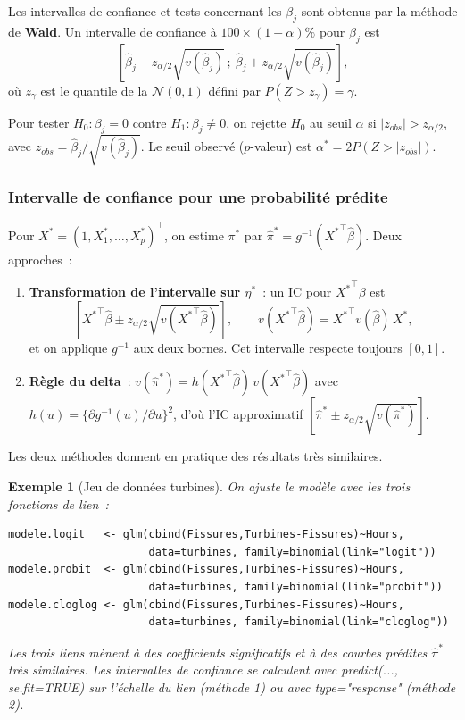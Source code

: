 \documentclass[11pt,letterpaper]{article}
\newtheorem{exemple}{Exemple}[section]
\begin{document}
Les intervalles de confiance et tests concernant les $\beta_j$ sont obtenus par la méthode de \textbf{Wald}. Un intervalle de confiance à $100\times(1-\alpha)\%$ pour $\beta_j$ est
$$\left[\hat\beta_j - z_{\alpha/2}\sqrt{v(\hat\beta_j)}\,;\ \hat\beta_j + z_{\alpha/2}\sqrt{v(\hat\beta_j)}\right],$$
où $z_\gamma$ est le quantile de la $\mathcal{N}(0,1)$ défini par $P(Z > z_\gamma) = \gamma$.

Pour tester $H_0: \beta_j = 0$ contre $H_1: \beta_j\neq 0$, on rejette $H_0$ au seuil $\alpha$ si $|z_{obs}| > z_{\alpha/2}$, avec $z_{obs} = \hat\beta_j/\sqrt{v(\hat\beta_j)}$. Le seuil observé ($p$-valeur) est $\alpha^* = 2P(Z > |z_{obs}|)$.

\subsubsection{Intervalle de confiance pour une probabilité prédite}

Pour $X^* = (1, X_1^*,\ldots,X_p^*)^\top$, on estime $\pi^*$ par $\hat\pi^* = g^{-1}({X^*}^\top\hat\beta)$. Deux approches~:
\begin{enumerate}
\item \textbf{Transformation de l'intervalle sur $\eta^*$}~: un IC pour ${X^*}^\top\beta$ est
$$\left[{X^*}^\top\hat\beta \pm z_{\alpha/2}\sqrt{v({X^*}^\top\hat\beta)}\right], \qquad v({X^*}^\top\hat\beta) = {X^*}^\top v(\hat\beta)\, X^*,$$
et on applique $g^{-1}$ aux deux bornes. Cet intervalle respecte toujours $[0,1]$.
\item \textbf{Règle du delta}~: $v(\hat\pi^*) = h({X^*}^\top\hat\beta)\, v({X^*}^\top\hat\beta)$ avec $h(u) = \{\partial g^{-1}(u)/\partial u\}^2$, d'où l'IC approximatif $\left[\hat\pi^* \pm z_{\alpha/2}\sqrt{v(\hat\pi^*)}\right]$.
\end{enumerate}
Les deux méthodes donnent en pratique des résultats très similaires.

\begin{exemple}[Jeu de données \textsf{turbines}]
On ajuste le modèle avec les trois fonctions de lien~:
\begin{verbatim}
modele.logit   <- glm(cbind(Fissures,Turbines-Fissures)~Hours,
                      data=turbines, family=binomial(link="logit"))
modele.probit  <- glm(cbind(Fissures,Turbines-Fissures)~Hours,
                      data=turbines, family=binomial(link="probit"))
modele.cloglog <- glm(cbind(Fissures,Turbines-Fissures)~Hours,
                      data=turbines, family=binomial(link="cloglog"))
\end{verbatim}
Les trois liens mènent à des coefficients significatifs et à des courbes prédites $\hat\pi^*$ très similaires. Les intervalles de confiance se calculent avec \textsf{predict(..., se.fit=TRUE)} sur l'échelle du lien (méthode 1) ou avec \textsf{type="response"} (méthode 2).
\end{exemple}
\end{document}
